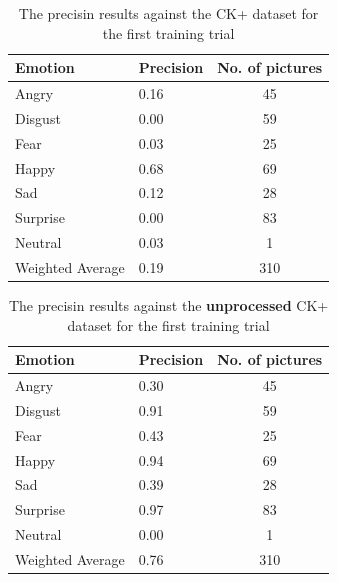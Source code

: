 \documentclass[runningheads,a4paper,11pt]{report}
\begin{document}
\begin{table}[htbp]
	\caption{The precisin results against the CK+ dataset for the first training trial}
	\label{fer_training_35k_ckp}
		\begin{center}
			\begin{tabular}{p{110pt}p{110pt}c}
				\textbf{Emotion}& \textbf{Precision}& \textbf{No. of pictures} \\
				\hline\hline
				Angry& 0.16& 45 \\
				Disgust& 0.00& 59 \\
				Fear& 0.03& 25 \\
				Happy& 0.68& 69 \\
				Sad& 0.12& 28 \\
				Surprise& 0.00& 83 \\
				Neutral& 0.03& 1 \\
				\hline
				Weighted Average& 0.19& 310
			\end{tabular}
		\end{center}
\end{table}

\begin{table}[htbp]
	\caption{The precisin results against the \textbf{unprocessed} CK+ dataset for the first training trial}
	\label{fer_training_35k_unprocessed_ckp}
		\begin{center}
			\begin{tabular}{p{110pt}p{110pt}c}
				\textbf{Emotion}& \textbf{Precision}& \textbf{No. of pictures} \\
				\hline\hline
				Angry& 0.30& 45 \\
				Disgust& 0.91& 59 \\
				Fear& 0.43& 25 \\
				Happy& 0.94& 69 \\
				Sad& 0.39& 28 \\
				Surprise& 0.97& 83 \\
				Neutral& 0.00& 1 \\
				\hline
				Weighted Average& 0.76& 310
			\end{tabular}
		\end{center}
\end{table}
\end{document}
